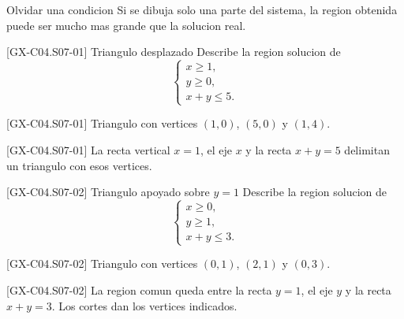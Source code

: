 \begin{commonerror}{Olvidar una condicion}
Si se dibuja solo una parte del sistema, la region obtenida puede ser mucho mas grande que la
solucion real.
\end{commonerror}

\begin{guidedexercise}{[GX-C04.S07-01] Triangulo desplazado}
Describe la region solucion de
\[
\begin{cases}
x\geq 1,\\
y\geq 0,\\
x+y\leq 5.
\end{cases}
\]
\end{guidedexercise}

\begin{shortanswer}{[GX-C04.S07-01]}
Triangulo con vertices \((1,0)\), \((5,0)\) y \((1,4)\).
\end{shortanswer}

\begin{fullsolution}{[GX-C04.S07-01]}
La recta vertical \(x=1\), el eje \(x\) y la recta \(x+y=5\) delimitan un triangulo con esos
vertices.
\end{fullsolution}

\begin{guidedexercise}{[GX-C04.S07-02] Triangulo apoyado sobre \(y=1\)}
Describe la region solucion de
\[
\begin{cases}
x\geq 0,\\
y\geq 1,\\
x+y\leq 3.
\end{cases}
\]
\end{guidedexercise}

\begin{shortanswer}{[GX-C04.S07-02]}
Triangulo con vertices \((0,1)\), \((2,1)\) y \((0,3)\).
\end{shortanswer}

\begin{fullsolution}{[GX-C04.S07-02]}
La region comun queda entre la recta \(y=1\), el eje \(y\) y la recta \(x+y=3\). Los cortes dan
los vertices indicados.
\end{fullsolution}

